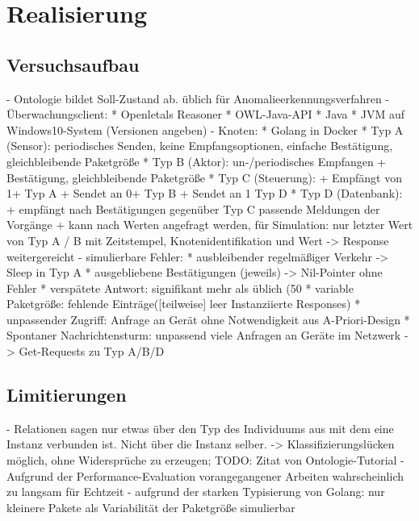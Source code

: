 \chapter{Realisierung}
\section{Versuchsaufbau}
- Ontologie bildet Soll-Zustand ab. üblich für Anomalieerkennungsverfahren \cite{ye2001anomaly}
- Überwachungsclient:
	* Openletals Reasoner
	* OWL-Java-API
	* Java
	* JVM auf Windows10-System (Versionen angeben)
- Knoten:
	* Golang in Docker
	* Typ A (Sensor): periodisches Senden, keine Empfangsoptionen, einfache Bestätigung, gleichbleibende Paketgröße
	* Typ B (Aktor): un-/periodisches Empfangen + Bestätigung, gleichbleibende Paketgröße
	* Typ C (Steuerung):
		+ Empfängt von 1+ Typ A
		+ Sendet an 0+ Typ B
		+ Sendet an 1 Typ D
	* Typ D (Datenbank):
		+ empfängt nach Bestätigungen gegenüber Typ C passende Meldungen der Vorgänge
		+ kann nach Werten angefragt werden, für Simulation: nur letzter Wert von Typ A / B mit Zeitstempel,  Knotenidentifikation und Wert -> Response weitergereicht
- simulierbare Fehler:
	* ausbleibender regelmäßiger Verkehr -> Sleep in Typ A
	* ausgebliebene Bestätigungen (jeweils) -> Nil-Pointer ohne Fehler
	* verspätete Antwort: signifikant mehr als üblich (50%
	* variable Paketgröße: fehlende Einträge([teilweise] leer Instanziierte Responses)
	* unpassender Zugriff: Anfrage an Gerät ohne Notwendigkeit aus A-Priori-Design
	* Spontaner Nachrichtensturm: unpassend viele Anfragen an Geräte im Netzwerk -> Get-Requests zu Typ A/B/D
\section{Limitierungen}
- Relationen sagen nur etwas über den Typ des Individuums aus mit dem eine Instanz verbunden ist. Nicht über die Instanz selber. -> Klassifizierungslücken möglich, ohne Widersprüche zu erzeugen; TODO: Zitat von Ontologie-Tutorial
- Aufgrund der Performance-Evaluation vorangegangener Arbeiten wahrscheinlich zu langsam für Echtzeit \cite{roy2010exploitation}
- aufgrund der starken Typisierung von Golang: nur kleinere Pakete als Variabilität der Paketgröße simulierbar